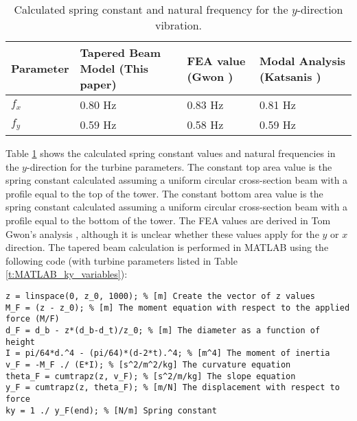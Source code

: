 \begin{table}[]
\caption{Calculated spring constant and natural frequency for the $y$-direction vibration.} \label{t:ky_values}
\begin{center}
\begin{tabular}{|p{1in}|p{1.5in}|p{1in}|p{1.3in}|}
\rowcolor[HTML]{EFEFEF} 
\hline
\textbf{Parameter} & \textbf{Tapered Beam Model (This paper)} & \textbf{FEA value (Gwon \cite{Gwon_paper})} & \textbf{Modal Analysis (Katsanis \cite{george2013transient})} \\ \hline
$f_x$ & 0.80 Hz & 0.83 Hz & 0.81 Hz\\ \hline
$f_y$ & 0.59 Hz & 0.58 Hz & 0.59 Hz\\ \hline
\end{tabular}
\end{center}
\end{table}

Table \ref{t:ky_values} shows the calculated spring constant values and natural frequencies in the $y$-direction for the turbine parameters.  The constant top area value is the spring constant calculated assuming a uniform circular cross-section beam with a profile equal to the top of the tower.  The constant bottom area value is the spring constant calculated assuming a uniform circular cross-section beam with a profile equal to the bottom of the tower.  The FEA values are derived in Tom Gwon's analysis \cite{Gwon_paper}, although it is unclear whether these values apply for the $y$ or $x$ direction.  The tapered beam calculation is performed in MATLAB using the following code (with turbine parameters listed in Table \ref{t:MATLAB_ky_variables}):
\begin{lstlisting}
z = linspace(0, z_0, 1000); % [m] Create the vector of z values
M_F = (z - z_0); % [m] The moment equation with respect to the applied force (M/F)
d_F = d_b - z*(d_b-d_t)/z_0; % [m] The diameter as a function of height
I = pi/64*d.^4 - (pi/64)*(d-2*t).^4; % [m^4] The moment of inertia
v_F = -M_F ./ (E*I); % [s^2/m^2/kg] The curvature equation
theta_F = cumtrapz(z, v_F); % [s^2/m/kg] The slope equation
y_F = cumtrapz(z, theta_F); % [m/N] The displacement with respect to force
ky = 1 ./ y_F(end); % [N/m] Spring constant
\end{lstlisting}
\FloatBarrier


